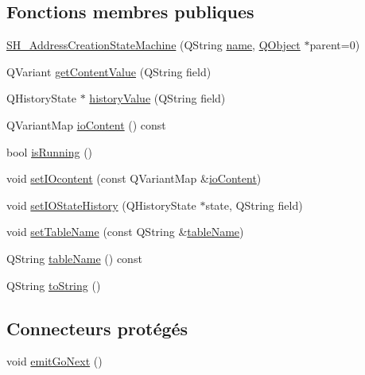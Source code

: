 \subsection*{Fonctions membres publiques}
\begin{DoxyCompactItemize}
\item 
\hyperlink{classSimpleHotel_1_1SH__AddressCreationStateMachine_a6899d9f08597313b4fda58ae077cfa8a}{S\-H\-\_\-\-Address\-Creation\-State\-Machine} (Q\-String \hyperlink{classSimpleHotel_1_1SH__NamedObject_ad144716345034c91cface8f3163a799e}{name}, \hyperlink{classQObject}{Q\-Object} $\ast$parent=0)
\item 
Q\-Variant \hyperlink{classSimpleHotel_1_1SH__InOutStateMachine_a4e2afab69163c7ce53dd6a40c793d5dc}{get\-Content\-Value} (Q\-String field)
\item 
Q\-History\-State $\ast$ \hyperlink{classSimpleHotel_1_1SH__InOutStateMachine_af9de98943b9428ed4144bc6695c1ada0}{history\-Value} (Q\-String field)
\item 
Q\-Variant\-Map \hyperlink{classSimpleHotel_1_1SH__InOutStateMachine_a378618937520bc65b6e25cd187a92aad}{io\-Content} () const 
\item 
bool \hyperlink{classSimpleHotel_1_1SH__GenericStateMachine_a23d9e26143a6732fa5a8f540eb827e03}{is\-Running} ()
\item 
void \hyperlink{classSimpleHotel_1_1SH__InOutStateMachine_a60245aa45ba2b9720965412774e123fb}{set\-I\-Ocontent} (const Q\-Variant\-Map \&\hyperlink{classSimpleHotel_1_1SH__InOutStateMachine_a378618937520bc65b6e25cd187a92aad}{io\-Content})
\item 
void \hyperlink{classSimpleHotel_1_1SH__InOutStateMachine_a7a6675495f101d29e8eb86df84961795}{set\-I\-O\-State\-History} (Q\-History\-State $\ast$state, Q\-String field)
\item 
void \hyperlink{classSimpleHotel_1_1SH__InOutStateMachine_adae23a212e9ba1e590f062994cd367a6}{set\-Table\-Name} (const Q\-String \&\hyperlink{classSimpleHotel_1_1SH__InOutStateMachine_a9fd170fd458e524ac0629b64d5323a45}{table\-Name})
\item 
Q\-String \hyperlink{classSimpleHotel_1_1SH__InOutStateMachine_a9fd170fd458e524ac0629b64d5323a45}{table\-Name} () const 
\item 
Q\-String \hyperlink{classSimpleHotel_1_1SH__GenericStateMachine_ad6dd1d0986c40684410ed94f1f610b12}{to\-String} ()
\end{DoxyCompactItemize}
\subsection*{Connecteurs protégés}
\begin{DoxyCompactItemize}
\item 
void \hyperlink{classSimpleHotel_1_1SH__GenericStateMachine_a37846ee6a4cb4d73cf2aff51cb025615}{emit\-Go\-Next} ()
\end{DoxyCompactItemize}
